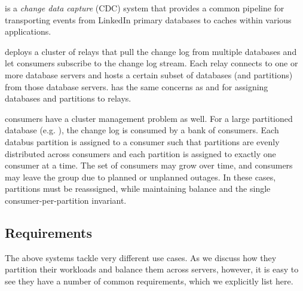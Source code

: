 \subheader{\databus}
\databus is a \emph{change data capture} (CDC) system that provides a common pipeline 
for transporting events from LinkedIn primary databases to caches within various applications. 

\databus deploys a cluster of relays that pull the change log from multiple databases and let consumers subscribe to the 
change log stream.  Each \databus relay connects to one or more database servers
and hosts a certain subset of databases (and partitions) from those database servers. 
\databus has the same concerns as \ES and \seas for assigning databases and
partitions to relays.

\databus consumers have a cluster management problem as well.  For a
large partitioned database (e.g. \ES), the change log is consumed by a bank of
consumers.  Each databus partition is assigned to a consumer such that
partitions are evenly distributed across consumers and each partition is
assigned to exactly one consumer at a time. The set of consumers may grow over
time, and consumers may leave the group due to planned or unplanned outages.  In 
these cases, partitions must be reasssigned, while maintaining balance and the
single consumer-per-partition invariant. 

\subsection{Requirements}
\label{sec:requirements}
%
The above systems tackle very different use cases.  As we discuss how they
partition their workloads and balance them across servers, however, it is easy
to see they have a number of common requirements, which we explicitly list here.


